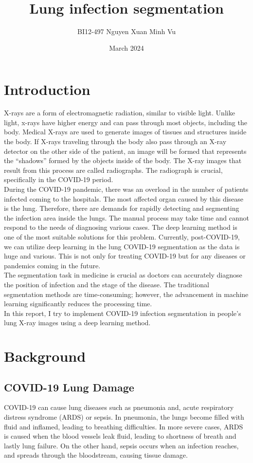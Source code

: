 \documentclass{article}
\title{Lung infection segmentation}
\author{BI12-497 Nguyen Xuan Minh Vu }
\date{March 2024}
\begin{document}
\maketitle
\section{Introduction}
X-rays are a form of electromagnetic radiation, similar to visible light. Unlike light, x-rays have higher energy and can pass through most objects, including the body. Medical X-rays are used to generate images of tissues and structures inside the body. If X-rays traveling through the body also pass through an X-ray detector on the other side of the patient, an image will be formed that represents the “shadows” formed by the objects inside of the body. The X-ray images that result from this process are called radiographs. The radiograph is crucial, specifically in the COVID-19 period.\\
During the COVID-19 pandemic, there was an overload in the number of patients infected coming to the hospitals. The most affected organ caused by this disease is the lung. Therefore, there are demands for rapidly detecting and segmenting the infection area inside the lungs. The manual process may take time and cannot respond to the needs of diagnosing various cases. The deep learning method is one of the most suitable solutions for this problem. Currently, post-COVID-19, we can utilize deep learning in the lung COVID-19 segmentation as the data is huge and various. This is not only for treating COVID-19 but for any diseases or pandemics coming in the future.\\
The segmentation task in medicine is crucial as doctors can accurately diagnose the position of infection and the stage of the disease. The traditional segmentation methods are time-consuming; however, the advancement in machine learning significantly reduces the processing time.\\
In this report, I try to implement COVID-19 infection segmentation in people's lung X-ray images using a deep learning method.

\section{Background}
\subsection{COVID-19 Lung Damage}
COVID-19 can cause lung diseases such as pneumonia and, acute respiratory distress syndrome (ARDS) or sepsis. In pneumonia, the lungs become filled with fluid and inflamed, leading to breathing difficulties. In more severe cases, ARDS is caused when the blood vessels leak fluid, leading to shortness of breath and lastly lung failure. On the other hand, sepsis occurs when an infection reaches, and spreads through the bloodstream, causing tissue damage.\\
\end{document}
